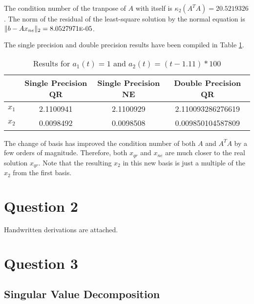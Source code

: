 \documentclass[letterpaper,12pt,]{article}
\begin{document}
The condition number of the tranpose of $A$ with itself is $\kappa_{2}(A^{T}A) = 20.5219326$. The norm of the residual of the least-square solution by the normal equation is $\|b-Ax_{ne}\|_2 = 8.0527971\text{\sc{e}-}05$.

The single precision and double precision results have been compiled in Table \ref{tab:r2}.

\begin{table}[h]
\centering
\begin{tabular}{cccc} \toprule
    {} & {Single Precision QR} & {Single Precision NE} & {Double Precision QR}\\ \midrule
    $x_1$ &	2.1100941 & 2.1100929 & 2.110093286276619\\
    $x_2$ &	0.0098492 & 0.0098508 & 0.009850104587809\\
\bottomrule
\end{tabular}
\caption{Results for $a_{1}(t) = 1$ and $a_{2}(t) = (t-1.11) \ast 100$}
\label{tab:r2}
\end{table}

The change of basis has improved the condition number of both $A$ and $A^TA$ by a few orders of magnitude. Therefore, both $x_{qr}$ and $x_{ne}$ are much closer to the real solution $x_{qr}$. Note that the resulting $x_2$ in this new basis is just a multiple of the $x_2$ from the first basis.

\section*{Question 2}

Handwritten derivations are attached.

\section*{Question 3}

\subsection*{Singular Value Decomposition}
\end{document}
